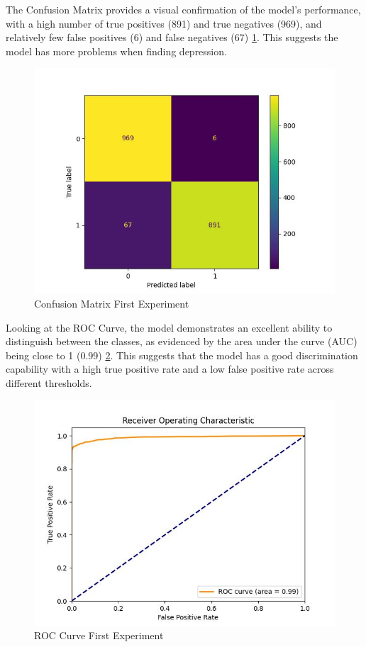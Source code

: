 \documentclass[3p,times,procedia]{elsarticle}
\begin{document}
The Confusion Matrix provides a visual confirmation of the model's performance, with a high number of true positives (891) and true negatives (969), and relatively few false positives (6) and false negatives (67) \ref{confusionMatrixFirstExperiment}. This suggests the model has more problems when finding depression.

\begin{figure}[htbp]
	\centering
		\includegraphics[scale=0.8]{./figures/metrics/experiment1English/confusionMatrix.jpg}
	\caption{Confusion Matrix First Experiment}
	\label{confusionMatrixFirstExperiment}
\end{figure}

Looking at the ROC Curve, the model demonstrates an excellent ability to distinguish between the classes, as evidenced by the area under the curve (AUC) being close to 1 (0.99) \ref{rocCurveFirstExperiment}. This suggests that the model has a good discrimination capability with a high true positive rate and a low false positive rate across different thresholds.

\begin{figure}[htbp]
	\centering
		\includegraphics[scale=0.8]{./figures/metrics/experiment1English/roc_curve.jpg}
	\caption{ROC Curve First Experiment}
	\label{rocCurveFirstExperiment}
\end{figure}
\end{document}
